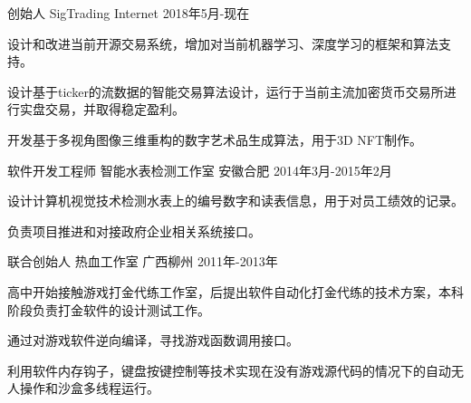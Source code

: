 

\begin{cventries}

  \cventry
    {创始人} %
    {SigTrading} %
    {Internet} %
    {2018年5月-现在} %
    {
      \begin{cvitems} %
        \item {设计和改进当前开源交易系统，增加对当前机器学习、深度学习的框架和算法支持。}
        \item {设计基于ticker的流数据的智能交易算法设计，运行于当前主流加密货币交易所进行实盘交易，并取得稳定盈利。}
        \item {开发基于多视角图像三维重构的数字艺术品生成算法，用于3D NFT制作。}
      \end{cvitems}
    }
	
	\cventry
	{软件开发工程师} %
	{智能水表检测工作室} %
	{安徽合肥} %
	{2014年3月-2015年2月} %
	{
		\begin{cvitems} %
			\item {设计计算机视觉技术检测水表上的编号数字和读表信息，用于对员工绩效的记录。}
			\item{负责项目推进和对接政府企业相关系统接口。}
		\end{cvitems}
	}

	\cventry
	{联合创始人} %
	{热血工作室} %
	{广西柳州} %
	{2011年-2013年} %
	{
		\begin{cvitems} %
			\item{高中开始接触游戏打金代练工作室，后提出软件自动化打金代练的技术方案，本科阶段负责打金软件的设计测试工作。}
			\item{通过对游戏软件逆向编译，寻找游戏函数调用接口。}
			\item{利用软件内存钩子，键盘按键控制等技术实现在没有游戏源代码的情况下的自动无人操作和沙盒多线程运行。}
		\end{cvitems}
	}
\end{cventries}
